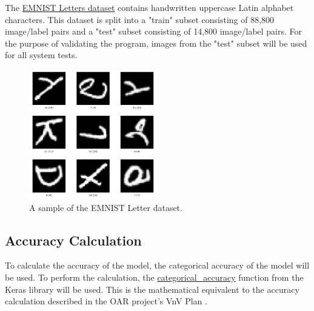 \documentclass[12pt, titlepage]{article}
\begin{document}
The \href{https://www.tensorflow.org/datasets/catalog/emnist#emnistletters}{EMNIST Letters dataset} contains handwritten uppercase Latin alphabet
characters. This dataset is split into a "train" subset consisting of 88,800
image/label pairs and a "test" subset consisting of 14,800 image/label pairs.
For the purpose of validating the \progname{} program, images from the "test"
subset will be used for all system tests.

\begin{figure}[H]
\centering
\includegraphics[width=0.5\textwidth]{emnist_letters.png}
\caption{A sample of the EMNIST Letter dataset.}
\label{FigUH}
\end{figure}

\subsection{Accuracy Calculation}
\label{sec:AccuracyCalculation}
To calculate the accuracy of the model, the categorical accuracy of the
model will be used. To perform the calculation, the \href{https://github.com/keras-team/keras/blob/c2e36f369b411ad1d0a40ac096fe35f73b9dffd3/keras/metrics.py}{categorical\_accuracy} function
from the Keras library will be used. This is the mathematical equivalent to the
accuracy calculation described in the OAR project's VnV Plan \citep{OARVnVPlan}.




\end{document}

